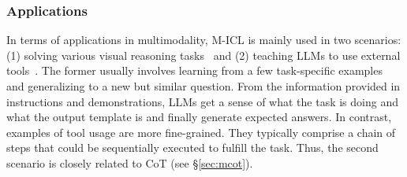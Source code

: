 \subsubsection{Applications}
In terms of applications in multimodality, M-ICL is mainly used in two scenarios: 
(1) solving various visual reasoning tasks~\cite{few-shot-vqa, alayrac2022flamingo, mm-react, frozen, otter} and (2) teaching LLMs to use external tools~\cite{chameleon, HuggingGPT, visprog}. The former usually involves learning from a few task-specific examples and generalizing to a new but similar question. From the information provided in instructions and demonstrations, LLMs get a sense of what the task is doing and what the output template is and finally generate expected answers. In contrast, examples of tool usage are more fine-grained. They typically comprise a chain of steps that could be sequentially executed to fulfill the task. Thus, the second scenario is closely related to CoT (see \S \ref{sec:mcot}).



